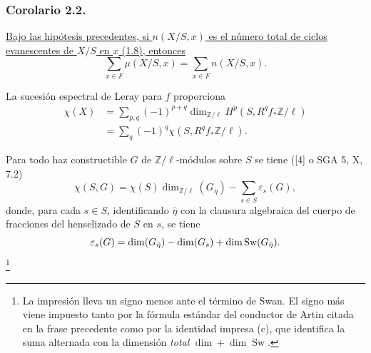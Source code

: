 \subsubsection*{Corolario 2.2.}
\underline{Bajo las hipótesis precedentes, si $n(X/S,x)$ es el número
total de ciclos evanescentes de $X/S$ en $x$ (1.8), entonces}
\[
\sum_{x\in F}\mu(X/S,x)
=\sum_{x\in F}n(X/S,x).
\]

La sucesión espectral de Leray para $f$ proporciona
\begin{align*}
\chi(X)
&=\sum_{p,q}(-1)^{p+q}
\dim_{\mathbb Z/\ell}H^p(S,R^qf_*\mathbb Z/\ell)\\
&=\sum_q(-1)^q\chi(S,R^qf_*\mathbb Z/\ell).
\end{align*}

\pageoriginale

Para todo haz constructible $G$ de $\mathbb Z/\ell$-módulos sobre
$S$ se tiene ([4] o SGA 5, X, 7.2)
\[
\chi(S,G)=\chi(S)\dim_{\mathbb Z/\ell}(G_{\bar\eta})
-\sum_{s\in S}\varepsilon_s(G),
\]
donde, para cada $s\in S$, identificando $\bar\eta$ con la clausura
algebraica del cuerpo de fracciones del henselizado de $S$ en $s$, se
tiene
\[
\varepsilon_s(G)=
\dim(G_{\bar\eta})-\dim(G_s)
\sisi{-}{+}\dim\operatorname{Sw}(G_{\bar\eta}).
\]
\footnote{La impresión lleva un signo menos ante el término de Swan.
El signo más viene impuesto tanto por la fórmula estándar del
conductor de Artin citada en la frase precedente como por la identidad
impresa (c), que identifica la suma alternada con la dimensión
\emph{total} $\dim+\dim\operatorname{Sw}$.}

